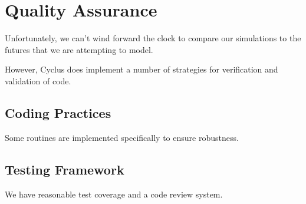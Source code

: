 \section{Quality Assurance}
%

%


Unfortunately, we can't wind forward the clock to compare our simulations to 
the futures that we are attempting to model.

However, Cyclus does implement a number of strategies for verification and 
validation of code.

\subsection{Coding Practices}

Some routines are implemented specifically to ensure robustness.

\subsection{Testing Framework}

We have reasonable test coverage and a code review system. 

